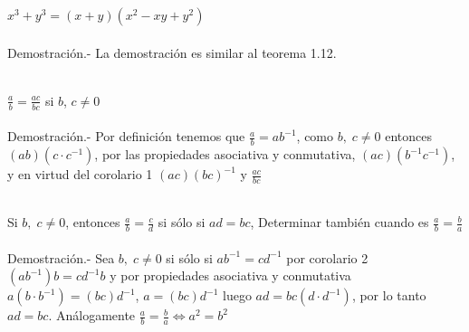 \begin{teo}
$x^3+y^3=(x+y)(x^2-xy+y^2)$\\\\
Demostración.- \;
La demostración es similar al teorema 1.12.\\\\
\end{teo}

\begin{teo}
$\displaystyle\frac{a}{b}=\frac{ac}{bc}$ si $b$, $c \neq 0$\\\\
Demostración.- \;
Por definición tenemos que $\displaystyle\frac{a}{b}=ab^{-1}$, como $b, \; c \neq 0$ entonces $(ab)(c\cdot c^{-1})$, por  las propiedades asociativa y conmutativa, $(ac)(b^{-1}c^{-1})$, y en virtud del corolario 1  $(ac)(bc)^{-1}$ y $\displaystyle\frac{ac}{bc}$ \\\\ 
\end{teo}

\begin{teo}
Si $b,\; c \neq 0$, entonces $\displaystyle\frac{a}{b}=\frac{c}{d}$ si sólo si $ad=bc$, Determinar también cuando es $\displaystyle\frac{a}{b}=\frac{b}{a}$\\\\
Demostración.- \;
Sea $b,\; c \neq 0$ si sólo si $ab^{-1}=cd^{-1}$ por corolario 2 $(ab^{-1})b=cd^{-1}b$ y por propiedades asociativa y conmutativa $a(b\cdot b^{-1})=(bc)d^{-1}$, $a=(bc)d^{-1}$ luego $ad=bc(d\cdot d^{-1})$, por lo tanto $ad=bc$. Análogamente $\displaystyle\frac{a}{b}=\frac{b}{a}\Leftrightarrow a^2=b^2$\\\\
 
\end{teo} 